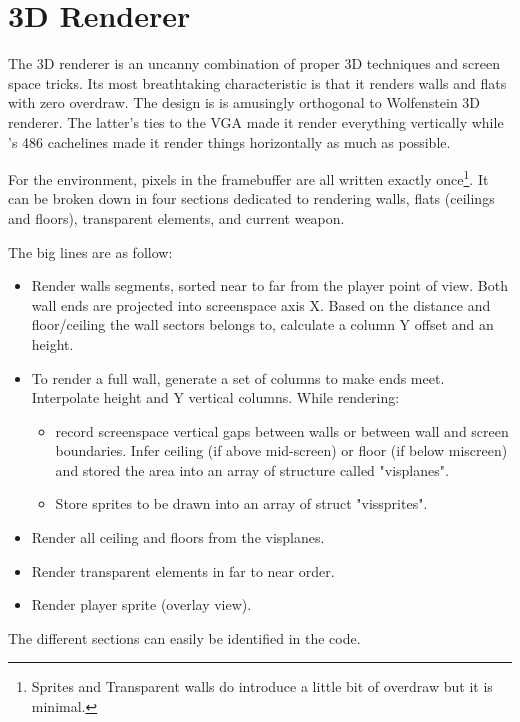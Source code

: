 \section{3D Renderer}
The 3D renderer is an uncanny combination of proper 3D techniques and screen space tricks. Its most breathtaking characteristic is that it renders walls and flats with zero overdraw. The design is is amusingly orthogonal to Wolfenstein 3D renderer. The latter's ties to the VGA made it render everything vertically while \doom's 486 cachelines made it render things horizontally as much as possible.\\
\par
 For the environment, pixels in the framebuffer are all written exactly once\footnote{Sprites and Transparent walls do introduce a little bit of overdraw but it is minimal.}. It can be broken down in four sections dedicated to rendering walls, flats (ceilings and floors), transparent elements, and current weapon.\\
\par
The big lines are as follow:
\begin{itemize}
\item Render walls segments, sorted near to far from the player point of view. Both wall ends are projected into screenspace axis X. Based on the distance and floor/ceiling the wall sectors belongs to, calculate a column Y offset and an height. 
\item To render a full wall, generate a set of columns to make ends meet. Interpolate height and Y vertical columns. While rendering:
   \begin{itemize}
     \item record screenspace vertical gaps between walls or between wall and screen boundaries. Infer ceiling (if above mid-screen) or floor (if below miscreen) and stored the area into an array of structure called "visplanes".
     \item Store sprites to be drawn into an array of struct "vissprites".
   \end{itemize}      
\item Render all ceiling and floors from the visplanes.
\item Render transparent elements in far to near order.
\item Render player sprite (overlay view).
\end{itemize}
\par
The different sections can easily be identified in the code.\\
\par
{}
\par
{}

